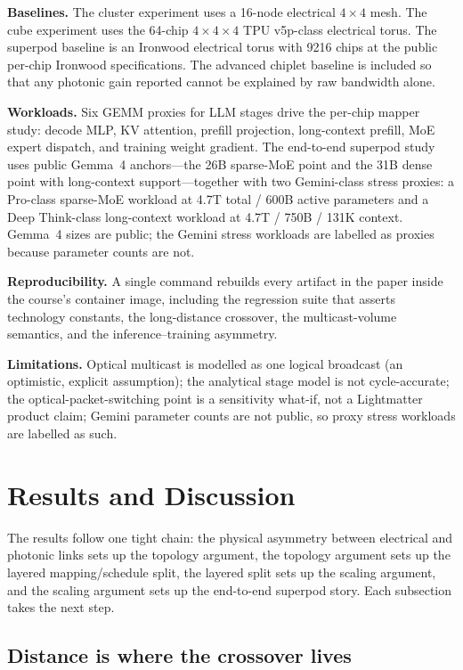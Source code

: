 \documentclass[conference]{IEEEtran}
\begin{document}
\textbf{Baselines.}
The cluster experiment uses a 16-node electrical $4{\times}4$
mesh. The cube experiment uses the 64-chip $4{\times}4{\times}4$
TPU v5p-class electrical torus. The superpod baseline is an
Ironwood electrical torus with 9216 chips at the public per-chip
Ironwood specifications. The advanced chiplet baseline is included
so that any photonic gain reported cannot be explained by raw
bandwidth alone.

\textbf{Workloads.}
Six GEMM proxies for LLM stages drive the per-chip mapper study:
decode MLP, KV attention, prefill projection, long-context
prefill, MoE expert dispatch, and training weight gradient. The
end-to-end superpod study uses public Gemma~4 anchors---the 26B
sparse-MoE point and the 31B dense point with long-context
support---together with two Gemini-class stress proxies: a
Pro-class sparse-MoE workload at 4.7T total / 600B active
parameters and a Deep Think-class long-context workload at 4.7T /
750B / 131K context. Gemma~4 sizes are public; the Gemini stress
workloads are labelled as proxies because parameter counts are
not.

\textbf{Reproducibility.}
A single command rebuilds every artifact in the paper inside the
course's container image, including the regression suite that
asserts technology constants, the long-distance crossover, the
multicast-volume semantics, and the inference--training
asymmetry.

\textbf{Limitations.}
Optical multicast is modelled as one logical broadcast (an
optimistic, explicit assumption); the analytical stage model is
not cycle-accurate; the optical-packet-switching point is a
sensitivity what-if, not a Lightmatter product claim; Gemini
parameter counts are not public, so proxy stress workloads are
labelled as such.

\section{Results and Discussion}
\label{sec:results}

The results follow one tight chain: the physical asymmetry between
electrical and photonic links sets up the topology argument, the
topology argument sets up the layered mapping/schedule split, the
layered split sets up the scaling argument, and the scaling
argument sets up the end-to-end superpod story. Each subsection
takes the next step.

\subsection{Distance is where the crossover lives}
\label{sec:r-distance}
\end{document}
